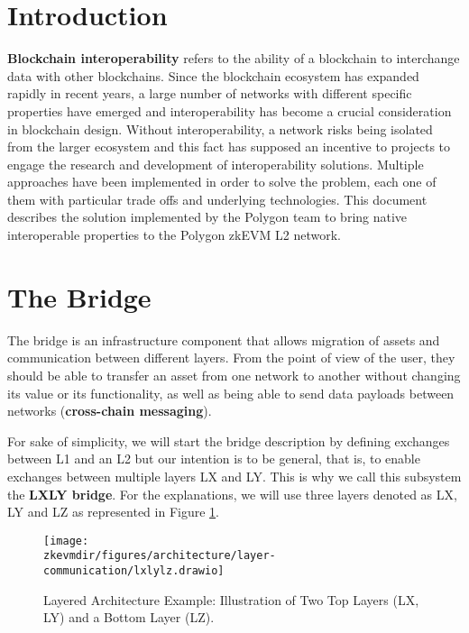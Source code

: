 


\section{Introduction}
\textbf{Blockchain interoperability} refers to the ability of a blockchain to interchange data with other blockchains. Since the blockchain ecosystem has expanded rapidly in recent years, a large number of networks with different specific properties have emerged and interoperability has become a crucial consideration in blockchain design. Without interoperability, a network risks being isolated from the larger ecosystem and this fact has supposed an incentive to projects to engage the research and development of interoperability solutions. Multiple approaches have been implemented in order to solve the problem, each one of them with particular trade offs and underlying technologies. This document describes the solution implemented by the Polygon team to bring native interoperable properties to the Polygon zkEVM L2 network.




\section{The Bridge}
The bridge is an infrastructure component that allows migration of assets and communication between different layers. From the point of view of the user, they should be able to transfer an asset from one network to another without changing its value or its functionality, as well as being able to send data payloads between networks (\textbf{cross-chain messaging}).

For sake of simplicity, we will start the bridge description by defining exchanges between L1 and an L2 but our intention is to be general, that is, to enable exchanges between multiple layers LX and LY. This is why we call this subsystem the \textbf{LXLY bridge}. For the explanations, we will use three layers denoted as LX, LY and LZ as represented in Figure \ref{fig:lxlylz}.

\begin{figure}[H]
\centering
\texttt{[image: \\zkevmdir/figures/architecture/layer-communication/lxlylz.drawio]}
\caption{Layered Architecture Example: Illustration of Two Top Layers (LX, LY) and a Bottom Layer (LZ).}
\label{fig:lxlylz}
\end{figure}








